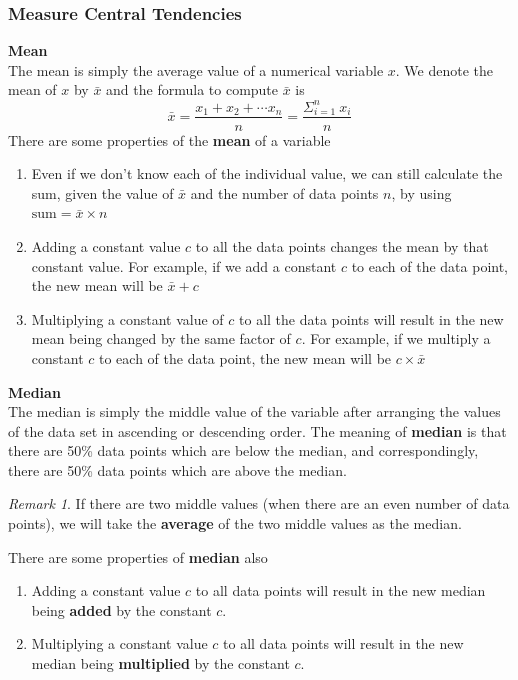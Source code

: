 \documentclass[math,code]{amznotes}
\theoremstyle{remark}
\newtheorem*{remark}{Remark}
\begin{document}
\subsubsection{Measure Central Tendencies}
\textbf{Mean} \\
The mean is simply the average value of a numerical variable $x$. We denote the mean of $x$ by $\bar{x}$ and the formula to compute $\bar{x}$ is
\begin{displaymath}
    \bar{x} = \frac{x_1+x_2+\cdots x_n}{n}=\frac{\Sigma_{i=1}^n~x_i}{n}
\end{displaymath}
There are some properties of the \textbf{mean} of a variable
\begin{enumerate}
    \item Even if we don't know each of the individual value, we can still calculate the sum, given the value of $\bar{x}$ and the number of data points $n$, by using $\text{sum}=\bar{x}\times n$
    \item Adding a constant value $c$ to all the data points changes the mean by that constant value. For example, if we add a constant $c$ to each of the data point, the new mean will be $\bar{x}+c$
    \item Multiplying a constant value of $c$ to all the data points will result in the new mean being changed by the same factor of $c$. For example, if we multiply a constant $c$ to each of the data point, the new mean will be $c\times\bar{x}$
\end{enumerate}

\textbf{Median}\\
The median is simply the middle value of the variable after arranging the values of the data set in ascending or descending order. \hypertarget{chapter1-median-meaning}{The meaning of \textbf{median} is that there are 50\% data points which are below the median, and correspondingly, there are 50\% data points which are above the median.}
\begin{notebox}
    \begin{remark}
        If there are two middle values (when there are an even number of data points), we will take the \textbf{average} of the two middle values as the median.
    \end{remark}
\end{notebox}
There are some properties of \textbf{median} also
\begin{enumerate}
    \item Adding a constant value $c$ to all data points will result in the new median being \textbf{added} by the constant $c$.
    \item Multiplying a constant value $c$ to all data points will result in the new median being \textbf{multiplied} by the constant $c$.
\end{enumerate}
\end{document}
